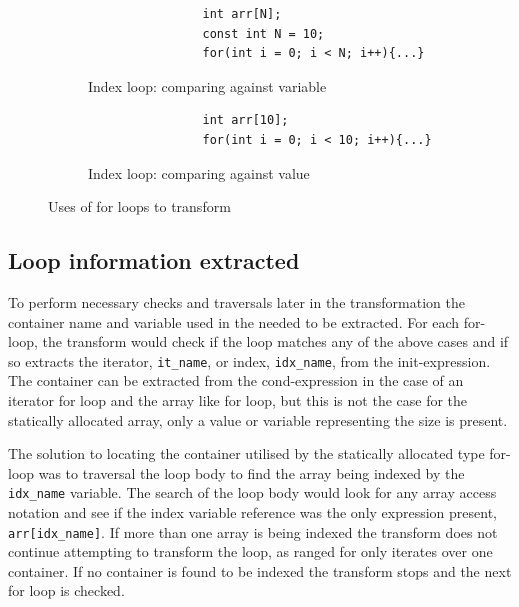\documentclass[bsc,frontabs,singlespacing,twoside,parskip,deptreport]{infthesis}
\begin{document}
\begin{figure}[h]
    \centering
    \begin{subfigure}[h]{\textwidth}
        \centering
        \begin{verbatim}
                int arr[N];
                const int N = 10;
                for(int i = 0; i < N; i++){...}
        \end{verbatim}
        \caption{Index loop: comparing against variable}
        \label{fig:code-static-for-cmp-var}
        \vspace{0.40cm}
    \end{subfigure}

    \begin{subfigure}[h]{\textwidth}
    \begin{verbatim}
                int arr[10];
                for(int i = 0; i < 10; i++){...}
    \end{verbatim}
    \caption{Index loop: comparing against value}
    \centering
    \label{fig:code-static-for-cmp-num}
    \end{subfigure}

    \caption{Uses of for loops to transform}
    \label{fig:code-static-for-cm}
\end{figure}


\subsection{Loop information extracted}
To perform necessary checks and traversals later in the transformation the container name and variable used in the needed to be extracted. For each for-loop, the transform would check if the loop matches any of the above cases and if so extracts the iterator, \texttt{it\_name}, or index,  \texttt{idx\_name}, from the init-expression. The container can be extracted from the cond-expression in the case of an iterator for loop and the array like for loop, but this is not the case for the statically allocated array, only a value or variable representing the size is present. 

The solution to locating the container utilised by the statically allocated type for-loop was to traversal the loop body to find the array being indexed by the \texttt{idx\_name} variable. The search of the loop body would look for any array access notation and see if the index variable reference was the only expression present, \texttt{arr[idx\_name]}. If more than one array is being indexed the transform does not continue attempting to transform the loop, as ranged for only iterates over one container. If no container is found to be indexed the transform stops and the next for loop is checked.
\end{document}
